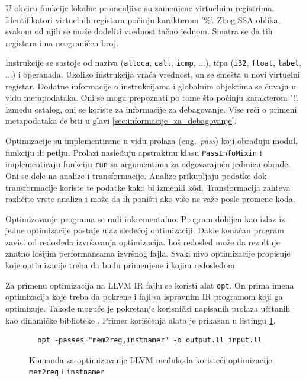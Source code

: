 \documentclass[12pt,oneside]{memoir}
\begin{document}
U okviru funkcije lokalne promenljive su zamenjene virtuelnim registrima.
Identifikatori virtuelnih registara počinju karakterom '\%'.
Zbog SSA oblika, svakom od njih se može dodeliti vrednost tačno jednom.
Smatra se da tih registara ima neograničen broj.

Instrukcije se sastoje od naziva (\verb|alloca|, \verb|call|, \verb|icmp|, ...), tipa (\verb|i32|, \verb|float|, \verb|label|, ...) i operanada.
Ukoliko instrukcija vraća vrednost, on se smešta u novi virtuelni registar.
Dodatne informacije o instrukcijama i globalnim objektima se čuvaju u vidu metapodataka.
Oni se mogu prepoznati po tome što počinju karakterom '!'.
Između ostalog, oni se koriste za informacije za debagovanje.
Vise reči o primeni metapodataka će biti u glavi \ref{sec:informacije_za_debagovanje}.

Optimizacije su implementirane u vidu prolaza (eng.~{\em pass}) koji obrađuju modul, funkciju ili petlju.
Prolazi nasleđuju apstraktnu klasu \verb|PassInfoMixin| i implementiraju funkciju \verb|run| sa argumentima za odgovarajuću jedinicu obrade.
Oni se dele na analize i transformacije.
Analize prikupljaju podatke dok transformacije koriste te podatke kako bi izmenili k\^od.
Transformacija zahteva različite vrste analiza i može da ih poništi ako više ne važe posle promene koda.

Optimizovanje programa se radi inkrementalno.
Program dobijen kao izlaz iz jedne optimizacije postaje ulaz sledećoj optimizaciji.
Dakle konačan program zavisi od redosleda izvršavanja optimizacija.
Loš redosled može da rezultuje znatno lošijim performansama izvršnog fajla.
Svaki nivo optimizacije propisuje koje optimizacije treba da budu primenjene i kojim redosledom.

Za primenu optimizacija na LLVM IR fajlu se koristi alat \verb|opt|.
On prima imena optimizacija koje treba da pokrene i fajl sa ispravnim IR programom koji ga optimizuje.
Takođe moguće je pokretanje korisnički napisanih prolaza učitanih kao dinamičke biblioteke \cite{pandey2017cookbook}.
Primer korišćenja alata je prikazan u listingu \ref{lst:opt_command}.
\begin{figure}[!ht]
\begin{verbatim}
  opt -passes="mem2reg,instnamer" -o output.ll input.ll
\end{verbatim}
\caption{Komanda za optimizovanje LLVM međukoda koristeći optimizacije \texttt{mem2reg} i \texttt{instnamer}}
\label{lst:opt_command}
\end{figure}
\end{document}
